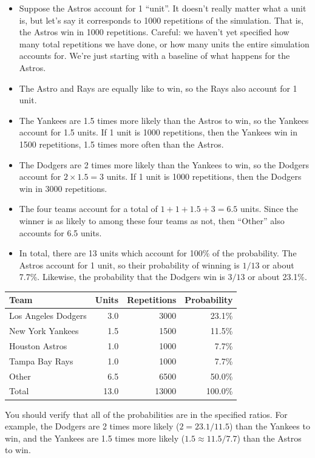 \documentclass[
]{book}
\providecommand{\tightlist}{%
  \setlength{\itemsep}{0pt}\setlength{\parskip}{0pt}}
\theoremstyle{definition}
\theoremstyle{definition}
\theoremstyle{definition}
\theoremstyle{remark}
\begin{document}
\begin{itemize}
\tightlist
\item
  Suppose the Astros account for 1 ``unit''. It doesn't really matter what a unit is, but let's say it corresponds to 1000 repetitions of the simulation. That is, the Astros win in 1000 repetitions. Careful: we haven't yet specified how many total repetitions we have done, or how many units the entire simulation accounts for. We're just starting with a baseline of what happens for the Astros.
\item
  The Astro and Rays are equally like to win, so the Rays also account for 1 unit.
\item
  The Yankees are 1.5 times more likely than the Astros to win, so the Yankees account for 1.5 units. If 1 unit is 1000 repetitions, then the Yankees win in 1500 repetitions, 1.5 times more often than the Astros.
\item
  The Dodgers are 2 times more likely than the Yankees to win, so the Dodgers account for \(2\times 1.5=3\) units. If 1 unit is 1000 repetitions, then the Dodgers win in 3000 repetitions.
\item
  The four teams account for a total of \(1+1+1.5+3 = 6.5\) units. Since the winner is as likely to among these four teams as not, then ``Other'' also accounts for 6.5 units.
\item
  In total, there are 13 units which account for 100\% of the probability. The Astros account for 1 unit, so their probability of winning is \(1/13\) or about 7.7\%. Likewise, the probability that the Dodgers win is \(3/13\) or about 23.1\%.
\end{itemize}

\begin{longtable}[]{@{}lrrr@{}}
\toprule
Team & Units & Repetitions & Probability\tabularnewline
\midrule
\endhead
Los Angeles Dodgers & 3.0 & 3000 & 23.1\%\tabularnewline
New York Yankees & 1.5 & 1500 & 11.5\%\tabularnewline
Houston Astros & 1.0 & 1000 & 7.7\%\tabularnewline
Tampa Bay Rays & 1.0 & 1000 & 7.7\%\tabularnewline
Other & 6.5 & 6500 & 50.0\%\tabularnewline
Total & 13.0 & 13000 & 100.0\%\tabularnewline
\bottomrule
\end{longtable}

You should verify that all of the probabilities are in the specified ratios. For example, the Dodgers are 2 times more likely (\(2 = 23.1 / 11.5\)) than the Yankees to win, and the Yankees are 1.5 times more likely (\(1.5 \approx 11.5 / 7.7\)) than the Astros to win.
\end{document}
